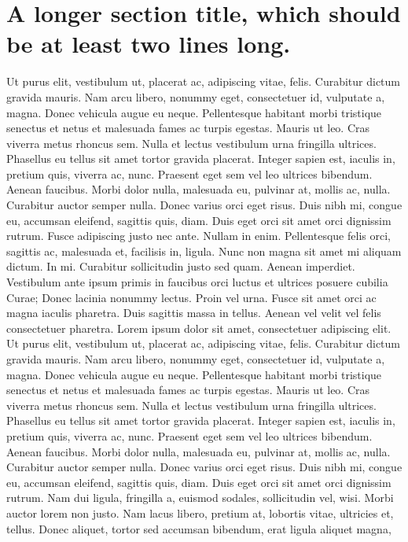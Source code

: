 \documentclass[draft,12pt,twoside,a4paper]{book}
\begin{document}
\section{A longer section title, which should be at least two lines long.}
Ut purus elit, vestibulum ut, placerat ac, adipiscing vitae, felis.
Curabitur dictum gravida mauris.
Nam arcu libero, nonummy eget, consectetuer id, vulputate a, magna.
Donec vehicula augue eu neque.
Pellentesque habitant morbi tristique senectus et netus et malesuada
 fames ac turpis egestas.
Mauris ut leo.
Cras viverra metus rhoncus sem.
Nulla et lectus vestibulum urna fringilla ultrices.
Phasellus eu tellus sit amet tortor gravida placerat.
Integer sapien est, iaculis in, pretium quis, viverra ac, nunc.
Praesent eget sem vel leo ultrices bibendum.
Aenean faucibus.
Morbi dolor nulla, malesuada eu, pulvinar at, mollis ac, nulla.
Curabitur auctor semper nulla.
Donec varius orci eget risus.
Duis nibh mi, congue eu, accumsan eleifend, sagittis quis, diam.
Duis eget orci sit amet orci dignissim rutrum.
Fusce adipiscing justo nec ante.
Nullam in enim.
Pellentesque felis orci, sagittis ac, malesuada et, facilisis in, ligula.
Nunc non magna sit amet mi aliquam dictum.
In mi.
Curabitur sollicitudin justo sed quam.
Aenean imperdiet.
Vestibulum ante ipsum primis in faucibus orci luctus et ultrices
posuere cubilia Curae; Donec lacinia nonummy lectus.
Proin vel urna.
Fusce sit amet orci ac magna iaculis pharetra.
Duis sagittis massa in tellus.
Aenean vel velit vel felis consectetuer pharetra.
Lorem ipsum dolor sit amet, consectetuer adipiscing elit.
Ut purus elit, vestibulum ut, placerat ac, adipiscing vitae, felis.
Curabitur dictum gravida mauris.
Nam arcu libero, nonummy eget, consectetuer id, vulputate a, magna.
Donec vehicula augue eu neque.
Pellentesque habitant morbi tristique senectus et netus et malesuada fames
 ac turpis egestas.
Mauris ut leo.
Cras viverra metus rhoncus sem.
Nulla et lectus vestibulum urna fringilla ultrices.
Phasellus eu tellus sit amet tortor gravida placerat.
Integer sapien est, iaculis in, pretium quis, viverra ac, nunc.
Praesent eget sem vel leo ultrices bibendum.
Aenean faucibus.
Morbi dolor nulla, malesuada eu, pulvinar at, mollis ac, nulla.
Curabitur auctor semper nulla.
Donec varius orci eget risus.
Duis nibh mi, congue eu, accumsan eleifend, sagittis quis, diam.
Duis eget orci sit amet orci dignissim rutrum.
Nam dui ligula, fringilla a, euismod sodales, sollicitudin vel, wisi.
Morbi auctor lorem non justo.
Nam lacus libero, pretium at, lobortis vitae, ultricies et, tellus.
Donec aliquet, tortor sed accumsan bibendum, erat ligula aliquet magna,
\end{document}
